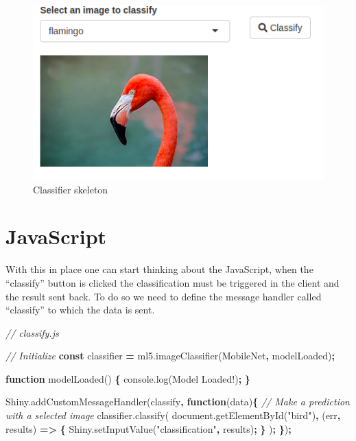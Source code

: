 \documentclass[
]{krantz}
\makeatletter
\newenvironment{Shaded}{\begin{snugshade}}{\end{snugshade}}
\newcommand{\AttributeTok}[1]{\textcolor[rgb]{0.61,0.61,0.61}{#1}}
\newcommand{\CommentTok}[1]{\textcolor[rgb]{0.37,0.37,0.37}{\textit{#1}}}
\newcommand{\KeywordTok}[1]{\textcolor[rgb]{0.27,0.27,0.27}{\textbf{#1}}}
\newcommand{\NormalTok}[1]{#1}
\newcommand{\OperatorTok}[1]{\textcolor[rgb]{0.43,0.43,0.43}{\textbf{#1}}}
\newcommand{\StringTok}[1]{\textcolor[rgb]{0.5,0.5,0.5}{#1}}
\newcommand{\VariableTok}[1]{\textcolor[rgb]{0,0,0}{#1}}
\newenvironment{kframe}{%
\medskip{}
\setlength{\fboxsep}{.8em}
 \def\at@end@of@kframe{}%
 \ifinner\ifhmode%
  \def\at@end@of@kframe{\end{minipage}}%
  \begin{minipage}{\columnwidth}%
 \fi\fi%
 \def\FrameCommand##1{\hskip\@totalleftmargin \hskip-\fboxsep
 \colorbox{shadecolor}{##1}\hskip-\fboxsep
     \hskip-\linewidth \hskip-\@totalleftmargin \hskip\columnwidth}%
 \MakeFramed {\advance\hsize-\width
   \@totalleftmargin\z@ \linewidth\hsize
   \@setminipage}}%
 {\par\unskip\endMakeFramed%
 \at@end@of@kframe}
\renewenvironment{Shaded}{\begin{kframe}}{\end{kframe}}
\makeatother
\begin{document}
\begin{figure}
\centering
\includegraphics{images/ml5-init.png}
\caption{Classifier skeleton}
\end{figure}

\hypertarget{v8-img-javascript}{%
\section{JavaScript}\label{v8-img-javascript}}

With this in place one can start thinking about the JavaScript, when the ``classify'' button is clicked the classification must be triggered in the client and the result sent back. To do so we need to define the message handler called ``classify'' to which the data is sent.

\begin{Shaded}
\begin{Highlighting}[]
\CommentTok{// classify.js}

\CommentTok{// Initialize }
\KeywordTok{const}\NormalTok{ classifier }\OperatorTok{=} \VariableTok{ml5}\NormalTok{.}\AttributeTok{imageClassifier}\NormalTok{(}\StringTok{\textquotesingle{}MobileNet\textquotesingle{}}\OperatorTok{,}\NormalTok{ modelLoaded)}\OperatorTok{;}

\KeywordTok{function} \AttributeTok{modelLoaded}\NormalTok{() }\OperatorTok{\{}
  \VariableTok{console}\NormalTok{.}\AttributeTok{log}\NormalTok{(}\StringTok{\textquotesingle{}Model Loaded!\textquotesingle{}}\NormalTok{)}\OperatorTok{;}
\OperatorTok{\}}

\VariableTok{Shiny}\NormalTok{.}\AttributeTok{addCustomMessageHandler}\NormalTok{(}\StringTok{\textquotesingle{}classify\textquotesingle{}}\OperatorTok{,} \KeywordTok{function}\NormalTok{(data)}\OperatorTok{\{}
  \CommentTok{// Make a prediction with a selected image}
  \VariableTok{classifier}\NormalTok{.}\AttributeTok{classify}\NormalTok{(}
    \VariableTok{document}\NormalTok{.}\AttributeTok{getElementById}\NormalTok{(}\StringTok{"bird"}\NormalTok{)}\OperatorTok{,}\NormalTok{ (err}\OperatorTok{,}\NormalTok{ results) }\KeywordTok{=>} \OperatorTok{\{}
      \VariableTok{Shiny}\NormalTok{.}\AttributeTok{setInputValue}\NormalTok{(}\StringTok{"classification"}\OperatorTok{,}\NormalTok{ results)}\OperatorTok{;}
    \OperatorTok{\}}
\NormalTok{  )}\OperatorTok{;}
\OperatorTok{\}}\NormalTok{)}\OperatorTok{;}
\end{Highlighting}
\end{Shaded}
\end{document}
